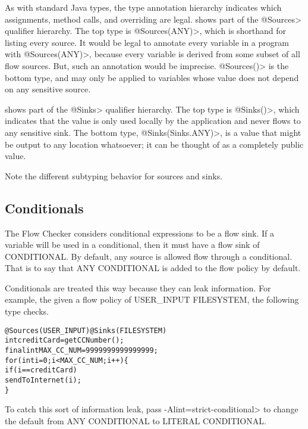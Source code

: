 As with standard Java types, the type annotation hierarchy indicates which
assignments, method calls, and overriding are legal.  
shows part of the \<@Sources>
qualifier hierarchy.  The top type is \<@Sources(ANY)>, which is
shorthand for listing every source.  It would be legal to annotate every
variable in a program with \<@Sources(ANY)>, because every variable is
derived from some subset of all flow sources.  But, such an annotation
would be imprecise.  \<@Sources(\ttcbs)>  is the
bottom type, and may only
be applied to variables whose value does not depend on any sensitive
source.


 shows part of the \<@Sinks>
qualifier hierarchy.  The top type is \<@Sinks(\ttcbs)>, which indicates
that the value is only used locally by the application and never flows to
any sensitive sink.  The bottom type, \<@Sinks(Sinks.ANY)>, is a
value that might be output to any location whatsoever; it can be thought of
as a completely public value.

Note the different subtyping behavior for sources and sinks.




\subsection{Conditionals\label{sec:conditionals}}

The Flow Checker considers conditional expressions to be a flow sink.  If a variable 
will be used in a conditional, then it must have a flow sink of CONDITIONAL.  By default, 
any source is allowed flow through a conditional.  That is to say that 
ANY \flowsto{} CONDITIONAL is added to the flow policy by default. 

Conditionals are treated this way because they can leak information. For example, the given a flow policy of  USER\_INPUT \flowsto{} FILESYSTEM, the following type checks.

\begin{alltt}
@Sources(USER_INPUT) @Sinks(FILESYSTEM)
int creditCard = getCCNumber();
final int MAX\_CC\_NUM = 9999999999999999;
for (int i = 0 ; i < MAX\_CC\_NUM ; i++)\{
   if (i == creditCard)
        sendToInternet(i);
\}
\end{alltt}

To catch this sort of information leak, pass
 \<-Alint=strict-conditional> to change the default from ANY \flowsto{} CONDITIONAL to 
 LITERAL \flowsto{} CONDITIONAL. 



